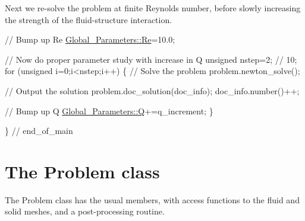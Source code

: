 Next we re-\/solve the problem at finite Reynolds number, before slowly increasing the strength of the fluid-\/structure interaction.


\begin{DoxyCodeInclude}
 
 \textcolor{comment}{// Bump up Re}
 \hyperlink{namespaceGlobal__Parameters_a9d72e94a9305c6a310940a6a427ebe06}{Global\_Parameters::Re}=10.0;

 \textcolor{comment}{// Now do proper parameter study with increase in Q}
 \textcolor{keywordtype}{unsigned} nstep=2; \textcolor{comment}{// 10;}
 \textcolor{keywordflow}{for} (\textcolor{keywordtype}{unsigned} i=0;i<nstep;i++)
  \{
   \textcolor{comment}{// Solve the problem}
   problem.newton\_solve();
   
   \textcolor{comment}{// Output the solution}
   problem.doc\_solution(doc\_info);
   doc\_info.number()++;

   \textcolor{comment}{// Bump up Q}
   \hyperlink{namespaceGlobal__Parameters_a7814fddf663e56168174a42d2cd6b4c1}{Global\_Parameters::Q}+=q\_increment;
  \}
 

\} \textcolor{comment}{// end\_of\_main}

\end{DoxyCodeInclude}




 

\hypertarget{index_class}{}\section{The Problem class}\label{index_class}
The {\ttfamily Problem} class has the usual members, with access functions to the fluid and solid meshes, and a post-\/processing routine.

